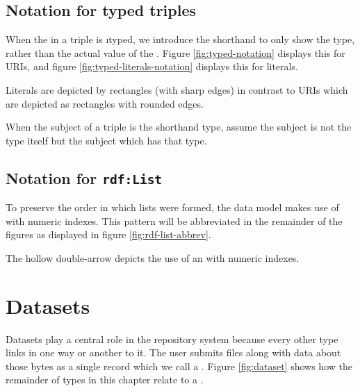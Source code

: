 \subsection{Notation for typed triples}

  When the  in a triple is \i{typed}, we introduce the shorthand
  to only show the type, rather than the actual value of the .
  Figure \ref{fig:typed-notation} displays this for URIs, and figure
  \ref{fig:typed-literals-notation} displays this for literals.


  Literals are depicted by rectangles (with sharp edges) in contrast to URIs
  which are depicted as rectangles with rounded edges.


  When the subject of a triple is the shorthand type, assume the subject is not
  the type itself but the subject which has that type.

\subsection{Notation for \texttt{rdf:List}}

  To preserve the order in which lists were formed, the data model makes use
  of  with numeric indexes.  This pattern will be abbreviated
  in the remainder of the figures as displayed in figure
  \ref{fig:rdf-list-abbrev}.


  The hollow double-arrow depicts the use of an  with numeric
  indexes.

\section{Datasets}

  Datasets play a central role in the repository system because every
  other type links in one way or another to it.  The user submits
  files along with data about those bytes as a single record which we
  call a .  Figure \ref{fig:dataset} shows how the
  remainder of types in this chapter relate to a .

